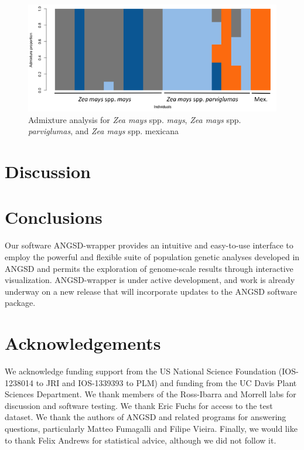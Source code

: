 \documentclass[10pt,a4paper]{article}
\begin{document}
\begin{figure}
\centering
\includegraphics[width=\linewidth]{figures/mt4labeled.png}
\caption{Admixture analysis for {\it Zea mays} spp. {\it mays}, {\it Zea mays} spp. {\it parviglumas}, and {\it Zea mays} spp. {mexicana} }
\label{fig:admixture}
\end{figure}

\section*{Discussion}

\section*{Conclusions}
Our software ANGSD-wrapper provides an intuitive and easy-to-use interface to employ the powerful and flexible suite of population genetic analyses developed in ANGSD \citep{korneliussen2014angsd} and permits the exploration of genome-scale results through interactive visualization.
ANGSD-wrapper is under active development, and work is already underway on a new release that will incorporate updates to the ANGSD software package.  

\section*{Acknowledgements}
We acknowledge funding support from the US National Science Foundation (IOS-1238014 to JRI and IOS-1339393 to PLM) and funding from the UC Davis Plant Sciences Department.  We thank members of the Ross-Ibarra and Morrell labs for discussion and software testing. We thank Eric Fuchs for access to the test dataset. We thank the authors of ANGSD and related programs for answering questions, particularly Matteo Fumagalli and Filipe Vieira. Finally, we would like to thank Felix Andrews for statistical advice, although we did not follow it. 





\end{document}
